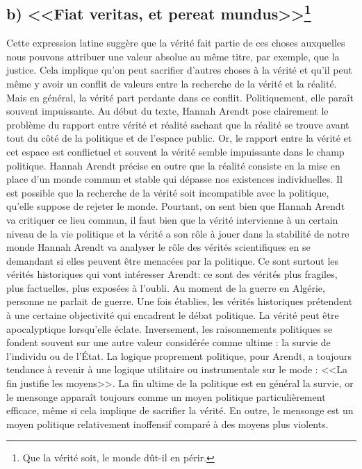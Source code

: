 \documentclass[12pt]{article}
\begin{document}
\subsection*{b) <<Fiat veritas, et pereat mundus>>\footnote{Que la vérité soit, le monde dût-il en périr.}}
Cette expression latine suggère que la vérité fait partie de ces choses auxquelles nous pouvons attribuer une valeur absolue au même titre, par exemple, que la justice.
Cela implique qu'on peut sacrifier d'autres choses à la vérité et qu'il peut même y avoir un conflit de valeurs entre la recherche de la vérité et la réalité.
Mais en général, la vérité part perdante dans ce conflit.
Politiquement, elle paraît souvent impuissante.
Au début du texte, Hannah Arendt pose clairement le problème du rapport entre vérité et réalité sachant que la réalité se trouve avant tout du côté de la politique et de l'espace public.
Or, le rapport entre la vérité et cet espace est conflictuel et souvent la vérité semble impuissante dans le champ politique.
Hannah Arendt précise en outre que la réalité consiste en la mise en place d'un monde commun et stable qui dépasse nos existences individuelles.
Il est possible que la recherche de la vérité soit incompatible avec la politique, qu'elle suppose de rejeter le monde.
Pourtant, on sent bien que Hannah Arendt va critiquer ce lieu commun, il faut bien que la vérité intervienne à un certain niveau de la vie politique et la vérité a son rôle à jouer dans la stabilité de notre monde
Hannah Arendt va analyser le rôle des vérités scientifiques en se demandant si elles peuvent être menacées par la politique.
Ce sont surtout les vérités historiques qui vont intéresser Arendt: ce sont des vérités plus fragiles, plus factuelles, plus exposées à l'oubli.
Au moment de la guerre en Algérie, personne ne parlait de guerre.
Une fois établies, les vérités historiques prétendent à une certaine objectivité qui encadrent le débat politique.
La vérité peut être apocalyptique lorsqu'elle éclate.
Inversement, les raisonnements politiques se fondent souvent sur une autre valeur considérée comme ultime : la survie de l'individu ou de l'État.
La logique proprement politique, pour Arendt, a toujours tendance à revenir à une logique utilitaire ou instrumentale sur le mode : <<La fin justifie les moyens>>.
La fin ultime de la politique est en général la survie, or le mensonge apparaît toujours comme un moyen politique particulièrement efficace, même si cela implique de sacrifier la vérité.
En outre, le mensonge est un moyen politique relativement inoffensif comparé à des moyens plus violents.
\end{document}
